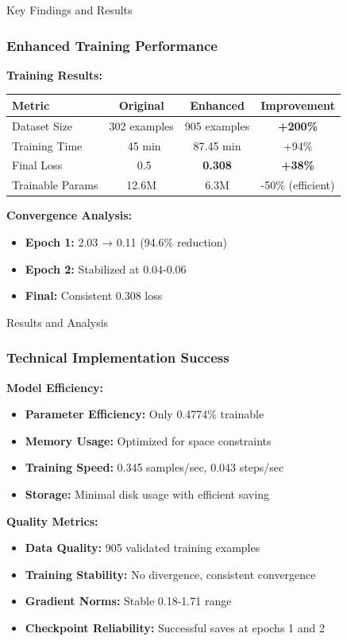\documentclass[aspectratio=169]{beamer}
\begin{document}
\begin{frame}{Key Findings and Results}
\frametitle{Enhanced Training Performance}

\textbf{Training Results:}
\begin{table}[h]
\centering
\begin{tabular}{|l|c|c|c|}
\hline
\textbf{Metric} & \textbf{Original} & \textbf{Enhanced} & \textbf{Improvement} \\
\hline
Dataset Size & 302 examples & 905 examples & \textbf{+200\%} \\
Training Time & ~45 min & 87.45 min & +94\% \\
Final Loss & ~0.5 & \textbf{0.308} & \textbf{+38\%} \\
Trainable Params & 12.6M & 6.3M & -50\% (efficient) \\
\hline
\end{tabular}
\end{table}

\textbf{Convergence Analysis:}
\begin{itemize}
    \item \textbf{Epoch 1:} 2.03 → 0.11 (94.6\% reduction)
    \item \textbf{Epoch 2:} Stabilized at 0.04-0.06
    \item \textbf{Final:} Consistent 0.308 loss
\end{itemize}
\end{frame}

\begin{frame}{Results and Analysis}
\frametitle{Technical Implementation Success}

\textbf{Model Efficiency:}
\begin{itemize}
    \item \textbf{Parameter Efficiency:} Only 0.4774\% trainable
    \item \textbf{Memory Usage:} Optimized for space constraints
    \item \textbf{Training Speed:} 0.345 samples/sec, 0.043 steps/sec
    \item \textbf{Storage:} Minimal disk usage with efficient saving
\end{itemize}

\textbf{Quality Metrics:}
\begin{itemize}
    \item \textbf{Data Quality:} 905 validated training examples
    \item \textbf{Training Stability:} No divergence, consistent convergence
    \item \textbf{Gradient Norms:} Stable 0.18-1.71 range
    \item \textbf{Checkpoint Reliability:} Successful saves at epochs 1 and 2
\end{itemize}
\end{frame}
\end{document}
